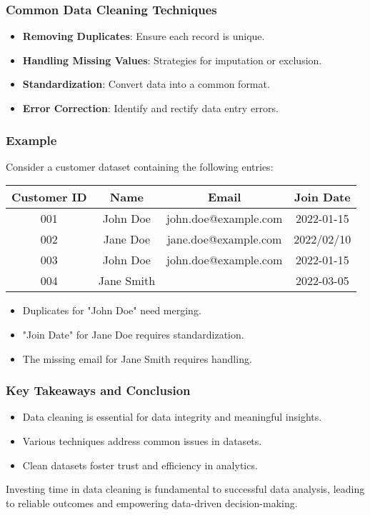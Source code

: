 \documentclass[aspectratio=169]{beamer}
\begin{document}
\begin{frame}[fragile]
    \frametitle{Common Data Cleaning Techniques}
    \begin{itemize}
        \item \textbf{Removing Duplicates}: Ensure each record is unique.
        \item \textbf{Handling Missing Values}: Strategies for imputation or exclusion.
        \item \textbf{Standardization}: Convert data into a common format.
        \item \textbf{Error Correction}: Identify and rectify data entry errors.
    \end{itemize}
\end{frame}

\begin{frame}[fragile]
    \frametitle{Example}
    Consider a customer dataset containing the following entries:
    \begin{table}[ht]
        \centering
        \begin{tabular}{|c|c|c|c|}
            \hline
            Customer ID & Name       & Email                   & Join Date  \\
            \hline
            001         & John Doe  & john.doe@example.com     & 2022-01-15 \\
            002         & Jane Doe  & jane.doe@example.com     & 2022/02/10 \\
            003         & John Doe  & john.doe@example.com     & 2022-01-15 \\
            004         & Jane Smith &                          & 2022-03-05 \\
            \hline
        \end{tabular}
    \end{table}

    \begin{itemize}
        \item Duplicates for "John Doe" need merging.
        \item "Join Date" for Jane Doe requires standardization.
        \item The missing email for Jane Smith requires handling.
    \end{itemize}
\end{frame}

\begin{frame}[fragile]
    \frametitle{Key Takeaways and Conclusion}
    \begin{itemize}
        \item Data cleaning is essential for data integrity and meaningful insights.
        \item Various techniques address common issues in datasets.
        \item Clean datasets foster trust and efficiency in analytics.
    \end{itemize}

    Investing time in data cleaning is fundamental to successful data analysis, leading to reliable outcomes and empowering data-driven decision-making.
\end{frame}
\end{document}

